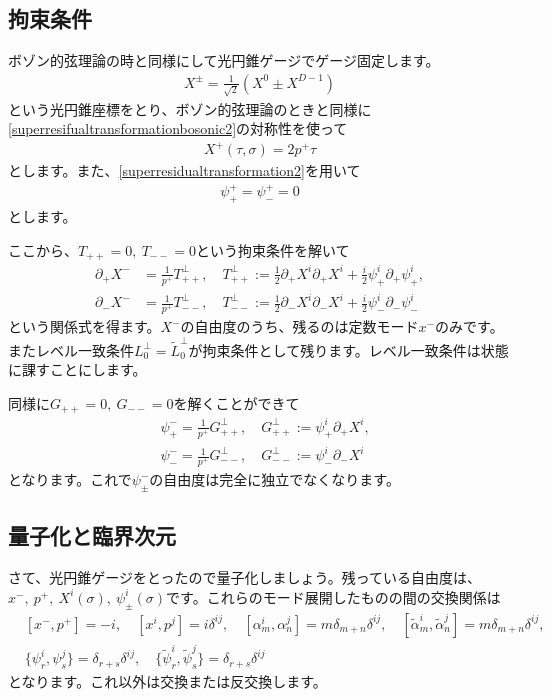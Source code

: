 \documentclass[report,paper=a4, fontsize=12pt, line_length=16cm, number_of_lines=33,dvipdfmx]{jlreq}
\numberwithin{equation}{chapter}
\numberwithin{equation}{section}
\newcommand{\del}{\partial}
\newcommand{\alphat}{\tilde{\alpha}}
\newcommand{\Lt}{\widetilde{L}}
\newcommand{\psit}{\tilde{\psi}}
\begin{document}
\subsection{拘束条件}
ボゾン的弦理論の時と同様にして光円錐ゲージでゲージ固定します。
\begin{align}
  X^{\pm}=\frac{1}{\sqrt{2}}(X^{0}\pm X^{D-1})
\end{align}
という光円錐座標をとり、ボゾン的弦理論のときと同様に\eqref{superresifualtransformationbosonic2}の対称性を使って
\begin{align}
  X^{+}(\tau,\sigma)=2p^{+} \tau
\end{align}
とします。また、\eqref{superresidualtransformation2}を用いて
\begin{align}
  \psi^{+}_{+}=\psi^{+}_{-}=0
\end{align}
とします。

ここから、$T_{++}=0,\ T_{--}=0$という拘束条件を解いて
\begin{align}
  \del_{+}X^{-}&=\frac{1}{p^{+}}T^{\perp}_{++},\quad T^{\perp}_{++}:=\frac12\del_{+}X^{i}\del_{+}X^{i}+\frac{i}{2}\psi^{i}_{+}\del_{+}\psi^{i}_{+},\label{alpha-zeromode}\\
  \del_{-}X^{-}&=\frac{1}{p^{+}}T^{\perp}_{--},\quad T^{\perp}_{--}:=\frac12\del_{-}X^{i}\del_{-}X^{i}+\frac{i}{2}\psi^{i}_{-}\del_{-}\psi^{i}_{-}
  \label{alphatilde-zeromode}
\end{align}
という関係式を得ます。$X^{-}$の自由度のうち、残るのは定数モード$x^{-}$のみです。またレベル一致条件$L^{\perp}_0=\Lt^{\perp}_0$が拘束条件として残ります。レベル一致条件は状態に課すことにします。

同様に$G_{++}=0,\ G_{--}=0$を解くことができて
\begin{align}
  &\psi_{+}^{-}=\frac{1}{p^+}G^{\perp}_{++},\quad G^{\perp}_{++}:=\psi^{i}_{+}\del_{+}X^{i},\\
  &\psi_{-}^{-}=\frac{1}{p^+}G^{\perp}_{--},\quad G^{\perp}_{--}:=\psi^{i}_{-}\del_{-}X^{i}
\end{align}
となります。これで$\psi_{\pm}^{-}$の自由度は完全に独立でなくなります。

\subsection{量子化と臨界次元}
さて、光円錐ゲージをとったので量子化しましょう。残っている自由度は、$x^{-},\ p^{+},\ X^{i}(\sigma),\ \psi^{i}_{\pm}(\sigma)$です。これらのモード展開したものの間の交換関係は
\begin{align}
  &[x^{-},p^{+}]=-i,\quad[x^{i},p^{j}]=i\delta^{ij},\quad
  [\alpha_{m}^{i},\alpha_{n}^{j}]=m\delta_{m+n}\delta^{ij},\quad
  [\alphat_{m}^{i},\alphat_{n}^{j}]=m\delta_{m+n}\delta^{ij},\nonumber\\
  &\{\psi^{i}_{r},\psi^{j}_{s}\}=\delta_{r+s}\delta^{ij},\quad
  \{\psit^{i}_{r},\psit^{j}_{s}\}=\delta_{r+s}\delta^{ij}
\end{align}
となります。これ以外は交換または反交換します。
\end{document}
